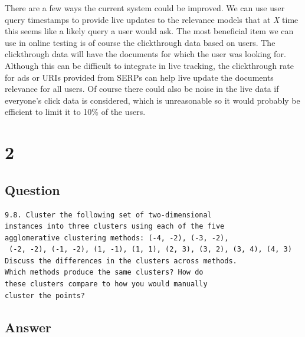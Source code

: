 \documentclass[letterpaper,11pt]{article}
\begin{document}
There are a few ways the current system could be improved.
We can use user query timestamps to provide live updates to the relevance models that at \textit{X} time this seems like a likely query a user would ask.
The most beneficial item we can use in online testing is of course the clickthrough data based on users.
The clickthrough data will have the documents for which the user was looking for.
Although this can be difficult to integrate in live tracking, the clickthrough rate for ads or URIs provided from SERPs can help live update the documents relevance for all users.
Of course there could also be noise in the live data if everyone's click data is considered, which is unreasonable so it would probably be efficient to limit it to 10\% of the users.



\clearpage


\section*{2}

\subsection*{Question}

\begin{verbatim}
9.8. Cluster the following set of two-dimensional 
instances into three clusters using each of the five 
agglomerative clustering methods: (-4, -2), (-3, -2),
 (-2, -2), (-1, -2), (1, -1), (1, 1), (2, 3), (3, 2), (3, 4), (4, 3)
Discuss the differences in the clusters across methods. 
Which methods produce the same clusters? How do 
these clusters compare to how you would manually
cluster the points?
\end{verbatim}

\subsection*{Answer}
\end{document}
